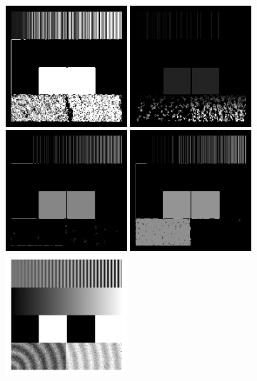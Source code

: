 \documentclass[
  12pt,
  openany]{book}
\begin{document}
\begin{figure}

{\centering \includegraphics[width=0.4\textwidth]{../imgs/dbscan_1_5} \includegraphics[width=0.4\textwidth]{../imgs/dbscan_1_10} \includegraphics[width=0.4\textwidth]{../imgs/dbscan_2_5} \includegraphics[width=0.4\textwidth]{../imgs/dbscan_2_10} \includegraphics[width=0.4\textwidth]{../imgs/geometric} 

}
\end{figure}
\end{document}
